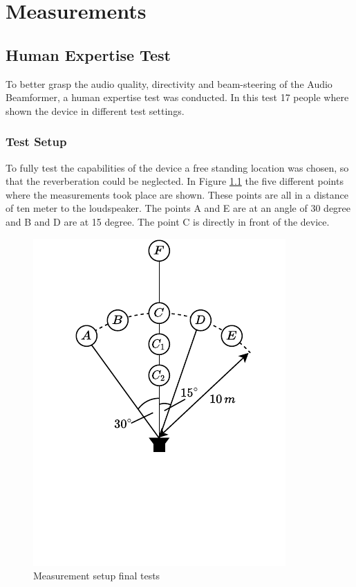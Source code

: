 \chapter{Measurements}
\section{Human Expertise Test}\label{6_sec:expertise_test}
To better grasp the audio quality, directivity and beam-steering of the Audio Beamformer, a human expertise test was conducted. In this test 17 people where shown the device in different test settings.   
\subsection{Test Setup}
To fully test the capabilities of the device a free standing location was chosen, so that the reverberation could be neglected. In Figure \ref{6_fig:measurement_setup_final} the five different points where the measurements took place are shown. These points are all in a distance of ten meter to the loudspeaker. The points A and E are at an angle of 30 degree and B and D are at 15 degree. The point C is directly in front of the device.  
\begin{figure}
    \centering
    \includegraphics[trim=0mm 22mm 0mm 0mm]{images/6_Measurements/MeasurementSetup.pdf}
    \caption{Measurement setup final tests}
    \label{6_fig:measurement_setup_final}
\end{figure}

